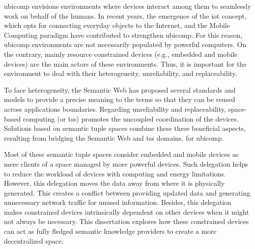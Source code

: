 




\begin{abstracts}        %
\acf{ubicomp} envisions environments where devices interact among them to seamlessly work on behalf of the humans.
In recent years, the emergence of the \acf{iot} concept, which opts for connecting everyday objects to the Internet, and the Mobile Computing paradigm have contributed to strengthen \ac{ubicomp}.
For this reason, \ac{ubicomp} environments are not necessarily populated by powerful computers.
On the contrary, mainly resource constrained devices (e.g., embedded and mobile devices) are the main actors of these environments.
Thus, it is important for the environment to deal with their heterogeneity, unreliability, and replaceability.


To face heterogeneity, the Semantic Web has proposed several standards and models to provide a precise meaning to the terms so that they can be reused across applications boundaries.
Regarding unreliability and replaceability, space-based computing (or \aclp{ts}) promotes the uncoupled coordination of the devices.
Solutions based on semantic tuple spaces combine these three beneficial aspects, resulting from bridging the Semantic Web and \aclp{ts} domains, for \ac{ubicomp}.

Most of these semantic tuple spaces consider embedded and mobile devices as mere clients of a space managed by more powerful devices.
Such delegation helps to reduce the workload of devices with computing and energy limitations.
However,  this delegation moves the data away from where it is physically generated.
This creates a conflict between providing updated data and generating unnecessary network traffic for unused information.
Besides, this delegation makes constrained devices intrinsically dependent on other devices when it might not always be necessary.
This dissertation explores how these constrained devices can act as fully fledged semantic knowledge providers to create a more decentralized space.


\end{abstracts}
